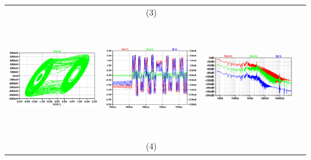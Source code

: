 \documentclass{rbf}
\begin{document}
\begin{table}[h]
\begin{tabular}{c c c c}
            & (3) &  \\
            \includegraphics[width=5cm,height=5cm]{R7/1379 C 220 210m atractor.png}&
            \includegraphics[width=5cm,height=5cm]{R7/1379 C 220 210m time series.png}&
            \includegraphics[width=5cm,height=5cm]{R7/1379 C 220 210m fft.png}&\\
            & (4) &  \\ 
            \hline  
       \end{tabular}
\end{table}
\end{document}
